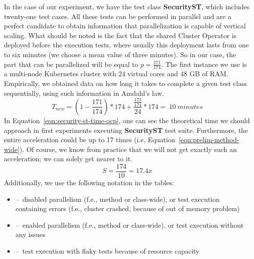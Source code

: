 In the case of our experiment, we have the test class \textbf {SecurityST}, which includes twenty-one test cases.
All these tests can be performed in parallel and are a perfect candidate to obtain information that parallelization is capable of vertical scaling.
What should be noted is the fact that the shared Cluster Operator is deployed before the execution tests,
where usually this deployment lasts from one to six minutes (we choose a mean value of three minutes).
So in our case, the part that can be parallelized will be equal to $p = \frac{171}{174}$.
The first instance we use is a multi-node Kubernetes cluster with 24 virtual cores and 48 GB of RAM.
Empirically, we obtained data on how long it takes to complete a given test class sequentially, using such information in Amdahl's law.
\begin{equation}
    \label{eqn:security-st-time-ocp}
    T_{new} = (1 - \frac{171}{174}) * 174 +  \frac{\frac{171}{174}}{24} * 174 =~10~minutes
    \tag{6}
\end{equation}
In Equation~\eqref{eqn:security-st-time-ocp}, one can see the theoretical time we should approach in first experiments executing \textbf{SecurityST} test suite.
Furthermore, the entire acceleration could be up to 17 times (i.e, Equation~\eqref{eqn:prelim-method-wide}).
Of course, we know from practice that we will not get exactly such an acceleration;
we can solely get nearer to it.
\begin{equation}
    \label{eqn:prelim-method-wide}
    S = \frac{174}{10} =17.4x
    \tag{7}
\end{equation}
Additionally, we use the following notation in the tables:
\begin{itemize}[itemsep=1mm, parsep=0pt]
    \item {\xmark} \---\ disabled parallelism (f.e., method or class-wide), or test execution containing errors (f.e., cluster crashed, because of out of memory problem)
    \item {\cmark} \---\ enabled parallelism (f.e., method or class-wide), or test execution without any issues
    \item {\selectfont{}\relax} \---\ test execution with flaky tests because of resource capacity
\end{itemize}


